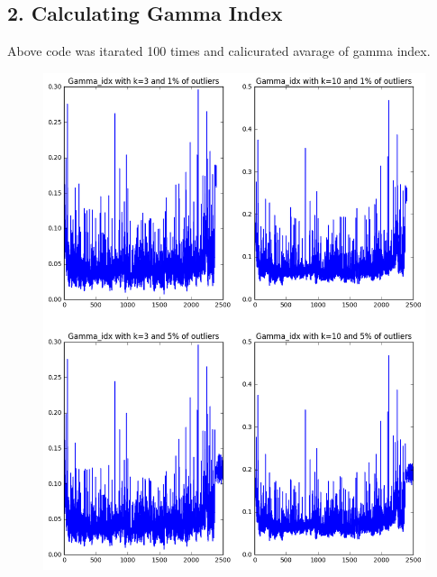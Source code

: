\documentclass[a4paper,11pt]{article}
\begin{document}
\subsection*{2. Calculating Gamma Index}
Above code was itarated 100 times and calicurated avarage of gamma index.
\begin{figure}[htbp]
  \includegraphics[scale=0.5]{index1.png}
\end{figure}
\end{document}
